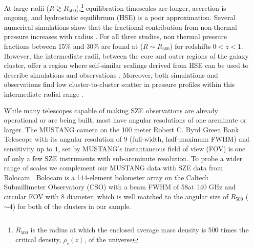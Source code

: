 At large radii ($R \gtrsim R_{500}$),\footnote{$R_{500}$
is the radius at which the enclosed average mass density is 500 times the critical density, 
$\rho_c(z)$, of the universe} equilibration timescales are longer, accretion is ongoing, 
and hydrostatic equilibrium (HSE) is a poor approximation. 
Several numerical simulations show that the fractional contribution
 from non-thermal pressure increases with radius \citep{shaw2010,battaglia2012,nelson2014}. 
For all three studies, non thermal pressure fractions between 15\% and 30\% are found at ($R \sim R_{500}$)
for redshifts $0 < z < 1$. However, the intermediate radii, between the core and outer regions of the 
galaxy cluster, offer a region where self-similar scalings derived from HSE can be used to describe simulations 
and observations \citep[e.g.][]{kravtsov2012}. Moreover, both simulations and observations find low
cluster-to-cluster scatter in pressure profiles within this intermediate radial range \citep[e.g.][]{borgani2004,
nagai2007,arnaud2010,bonamente2012,planck2013a,sayers2013}.

While many telescopes capable of making SZE observations are already operational or are being built, most have
angular resolutions of one arcminute or larger. The MUSTANG camera \citep{dicker2008}
on the 100 meter Robert C. Byrd Green Bank Telescope \citep[GBT, ][]{jewell2004} with its angular resolution of 9\asec 
(full-width, half-maximum FWHM) and sensitivity up to $1$\amin, set by MUSTANG's instantaneous field of view (FOV)
is one of only a few SZE instruments with sub-arcminute resolution.
To probe a wider range of scales we complement our MUSTANG data with SZE data from Bolocam \citep{glenn1998}. 
Bolocam is a 144-element bolometer
array on the Caltech Submillimeter Observatory (CSO) with a beam FWHM of 58\asecs at 140 GHz and circular FOV with 8\amins 
diameter, which is well matched to the angular size of $R_{500}$ ($\sim 4$\amin) for both of the clusters in our sample. 


